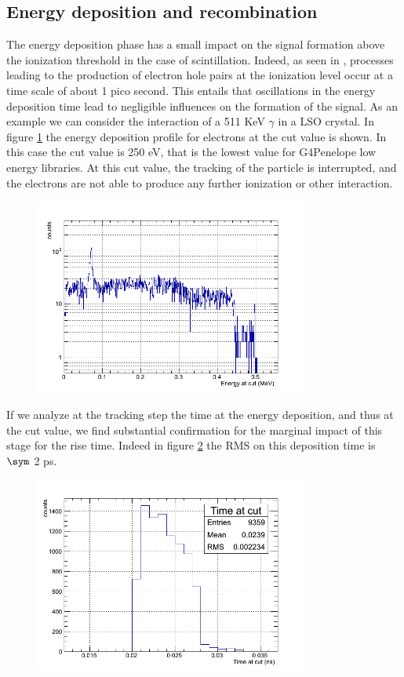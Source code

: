 \subsection{Energy deposition and recombination}
The energy deposition phase has a small impact on the signal formation above the ionization threshold in the case of scintillation. Indeed, as seen in \cite{Lecoq2006}, processes leading to the production of electron hole pairs at the ionization level occur at a time scale of about 1 pico second. This entails that oscillations in the energy deposition time lead to negligible influences on the formation of the signal. As an example we can consider the interaction of a 511 KeV $\gamma$ in a LSO crystal. In figure \ref{fig:energy_dep} the energy deposition profile for electrons at the cut value is shown. In this case the cut value is 250 eV, that is the lowest value for G4Penelope low energy libraries. At this cut value, the tracking of the particle is interrupted, and the electrons are not able to produce any further ionization or other interaction.  
\begin{figure}[htbp]
\begin{center}
\includegraphics[width=9cm]{../Pictures/Chapter_6/energy_und_thr.png}
\end{center}
\caption[]{}
\label{fig:energy_dep}
\end{figure}

If we analyze at the tracking step the time at the energy deposition, and thus at the cut value, we find substantial confirmation for the marginal impact of this stage for the rise time. Indeed in figure \ref{fig:energy_dep_time} the RMS on this deposition time is $\sym$ 2 ps.
\begin{figure}[htbp]
\begin{center}
\includegraphics[width=9cm]{../Pictures/Chapter_6/time_und_thr.png}
\end{center}
\caption[]{}
\label{fig:energy_dep_time}
\end{figure}

